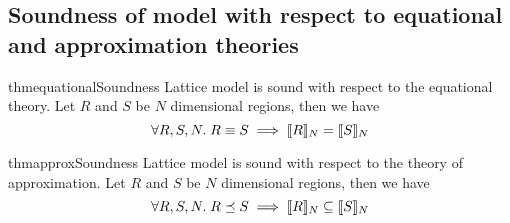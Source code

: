 \subsection{Soundness of model with respect to equational and approximation theories}

\begin{restatable}{thm}{equationalSoundness}
  Lattice model is sound with respect to the equational theory. Let $R$ and $S$
  be $N$ dimensional regions, then we have
%
  \begin{equation*}
    \forall R, S, N. \; R \equiv S \implies \llbracket{} {R} \rrbracket{}_N = \llbracket{} {S} \rrbracket{}_N
  \end{equation*}
\end{restatable}

\begin{restatable}{thm}{approxSoundness}
  Lattice model is sound with respect to the theory of approximation. Let $R$
  and $S$ be $N$ dimensional regions, then we have
%
  \begin{equation*}
    \forall R, S, N. \; R \preceq S \implies \llbracket{} {R} \rrbracket{}_N \subseteq \llbracket{} {S} \rrbracket{}_N
  \end{equation*}
\end{restatable}

